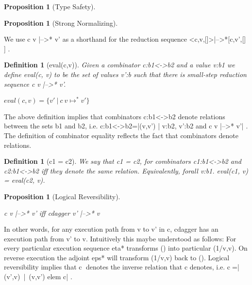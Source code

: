 \documentclass[preprint]{sigplanconf}
\newcommand{\xcomment}[2]{\textbf{#1:~\textsl{#2}}}
\newcommand{\roshan}[1]{\xcomment{Roshan}{#1}}
\newcommand{\asterix}[0]{*}
\newtheorem{definition}[theorem]{Definition}
\newtheorem{proposition}[theorem]{Proposition}
\begin{document}

\begin{proposition}[Type Safety]
  
\end{proposition}

\begin{proposition}[Strong Normalizing]
  
\end{proposition}

\noindent
We use {{c v |-->* v'}} as a shorthand for the reduction sequence
{{<c,v,[]>|-->*{[c,v',[] ]} }}.

\begin{definition}[eval(c,v)]

Given a combinator {{c:b1<->b2}} and a value {{v:b1}} we define
{{eval(c, v)}} to be the set of values {{v':b}} such that there is
small-step reduction sequence {{c v |-->* v'}}.

$eval(c, v) = \{v'~|~ c~ v\mapsto^{\asterix} v' \} $
\end{definition}

The above definition implies that combinators {{c:b1<->b2}} denote
relations between the sets {{b1}} and {{b2}}, i.e.
{{c:b1<->b2={|(v,v') | v:b2, v':b2 and c v |-->* v'|} }}.  The
definition of combinator equality reflects the fact that combinators
denote relations.

\begin{definition}[{{c1 = c2}}]
We say that {{c1 = c2}}, for combinators {{c1:b1<->b2}} and
{{c2:b1<->b2}} iff they denote the same relation. Equivalently,
{{forall v:b1. eval(c1, v) = eval(c2, v)}}.
\end{definition}

\begin{proposition}[Logical Reversibility]
\label{prop:logrev2} ~

{{c v |-->* v'}} iff {{ c{dagger} v' |-->* v}}
\end{proposition}

In other words, for any execution path from {{v}} to {{v'}} in {{c}},
{{c{dagger} }} has an execution path from {{v'}} to {{v}}.
Intuitively this maybe understood as follows: For every particular
execution sequence {{eta*}} transforms {{()}} into particular
{{(1/v,v)}}. On reverse execution the adjoint {{eps*}} will transform
{{(1/v,v)}} back to {{()}}.  Logical reversibility implies that
{{c^^^}} denotes the inverse relation that {{c}} denotes, i.e.
{{c^^^={|(v',v)~|~(v,v') elem c|} }}.
\end{document}
